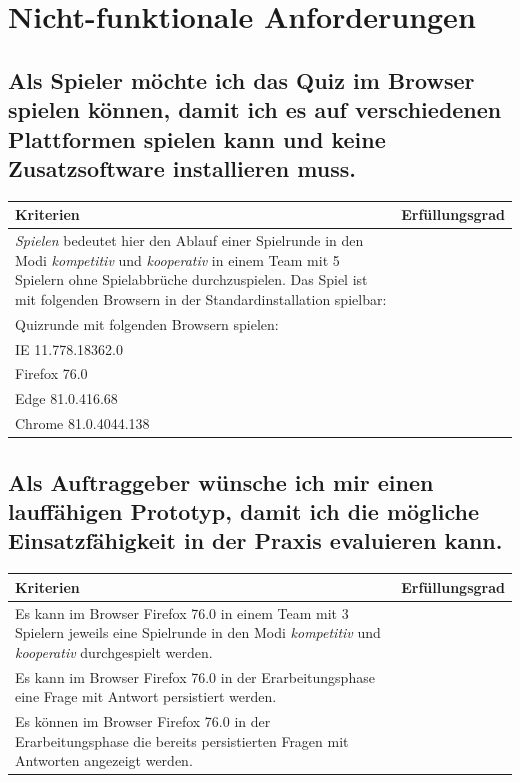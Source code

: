 \documentclass[a4paper,11pt,listof=numbered,glossary=totoc,parskip=half,toc=bib]{scrreprt}
\begin{document}
\begin{appendices}
\begin{tabularx}{\textwidth}{Xr}
			\bottomrule
		\end{tabularx}	
		
		\section{Nicht-funktionale Anforderungen}
		
		\subsection{Als Spieler möchte ich das Quiz im Browser spielen können, damit ich es auf verschiedenen
Plattformen spielen kann und keine Zusatzsoftware installieren muss.}
		\begin{tabularx}{\textwidth}{Xr}
			
			Kriterien & Erfüllungsgrad \\
			\midrule
		\textit{Spielen} bedeutet hier den Ablauf einer Spielrunde in den Modi \textit{kompetitiv} und \textit{kooperativ} in einem Team mit 5 Spielern ohne Spielabbrüche durchzuspielen. 	
		Das Spiel ist mit folgenden Browsern in der Standardinstallation spielbar: & \\
		Quizrunde mit folgenden Browsern spielen: & \\
		IE 11.778.18362.0 & \\
		Firefox 76.0 & \\
		Edge 81.0.416.68 & \\
		Chrome 81.0.4044.138 & \\
			\bottomrule
		\end{tabularx}	
			
		\subsection{Als Auftraggeber wünsche ich mir einen lauffähigen Prototyp, damit ich die mögliche Einsatzfähigkeit in der Praxis evaluieren kann.}
		\begin{tabularx}{\textwidth}{Xr}
			
			Kriterien & Erfüllungsgrad \\
			\midrule
			Es kann im Browser Firefox 76.0 in einem Team mit 3 Spielern jeweils eine Spielrunde in den Modi \textit{kompetitiv} und \textit{kooperativ} durchgespielt werden. & \\
			Es kann im Browser Firefox 76.0 in der Erarbeitungsphase eine Frage mit Antwort persistiert werden. & \\
			Es können im Browser Firefox 76.0 in der Erarbeitungsphase die bereits persistierten Fragen mit Antworten angezeigt werden. & \\
			

\end{tabularx}
\end{appendices}
\end{document}
